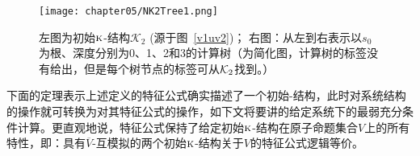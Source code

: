 \begin{example}
	
	
	\begin{figure}
		\centering
		\texttt{[image: chapter05/NK2Tree1.png]}
		\caption{左图为初始$\textsc{k}$-结构$\mathcal{K}_2$ (源于图~\ref{v1uv2})； 右图：从左到右表示以$s_0$为根、深度分别为0、1、2和3的计算树（为简化图，计算树的标签没有给出，但是每个树节点的标签可从${\cal K}_2$找到。）}\label{fig:K2Tree}
	\end{figure}


\end{example}


下面的定理表示上述定义的特征公式确实描述了一个初始\MPK-结构，此时对系统结构的操作就可转换为对其特征公式的操作，如下文将要讲的给定系统下的最弱充分条件计算。更直观地说，特征公式保持了给定初始$\textsc{k}$-结构在原子命题集合$V$上的所有特性，即：具有$\overline{V}$-互模拟的两个初始$\textsc{k}$-结构关于$V$的特征公式逻辑等价。

